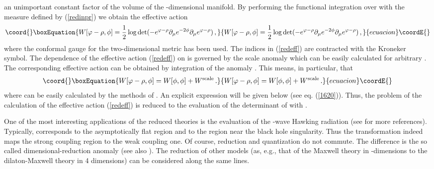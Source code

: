 \documentclass[a4paper,12pt]{article}
\begin{document}
an unimportant constant factor of
the volume of the \coordHE{}-dimensional manifold.
By performing the 
functional integration over \myHighlight{$\psi$}\coordHE{} with the measure defined
by (\ref{redinpr}) we obtain the effective action
\begin{equation}\coord{}\boxEquation{
W[\varphi -\rho ,\phi ]
=\frac 12 \log \det (-e^{\varphi -\rho }
\partial_\mu e^{-2\phi} \partial_\mu e^{\varphi -\rho } )\,,
\label{redeff}
}{
W[\varphi -\rho ,\phi ]
=\frac 12 \log \det (-e^{\varphi -\rho }
\partial_\mu e^{-2\phi} \partial_\mu e^{\varphi -\rho } )\,,
}{ecuacion}\coordE{}\end{equation}
where the conformal gauge for the two-dimensional metric 
\coordHE{} 
has been used. The indices
in (\ref{redeff}) are contracted with the Kroneker symbol.
The dependence of the effective action (\ref{redeff}) on 
\myHighlight{$\varphi -\rho$}\coordHE{} is governed by the scale anomaly which
can be easily calculated for arbitrary \myHighlight{$\varphi -\rho$}\coordHE{}.
The corresponding effective action can be
obtained by integration of the anomaly \cite{Kummer:1997jr,Mukhanov:1994ax}.
This means, in particular, that 
\begin{equation}\coord{}\boxEquation{
W[\varphi -\rho ,\phi ]=W[\phi ,\phi ]+W^{\mbox{\scriptsize scale}}\,.
\label{scaling}
}{
W[\varphi -\rho ,\phi ]=W[\phi ,\phi ]+W^{\mbox{\scriptsize scale}}\,.
}{ecuacion}\coordE{}\end{equation}
where \coordHE{} can be easily calculated
by the methods of 
\cite{Kummer:1997jr,Alvarez:1983zi,Dowker:1990ue,Tseytlin:2000jr}.
An explicit expression will be given below (see eq. (\ref{1620})).
Thus, the problem of the calculation of the
effective action (\ref{redeff}) is  reduced to the evaluation of 
the determinant of \myHighlight{$\Delta_+$}\coordHE{} with \coordHE{}.

One of the most interesting applications of the reduced
theories is the evaluation of the \coordHE{}-wave Hawking radiation
\cite{Mukhanov:1994ax} (see \cite{Kummer:1999zy} for more references).
Typically, \myHighlight{$\phi\to -\infty$}\coordHE{} corresponds to the asymptotically
flat region and \myHighlight{$\phi\to +\infty$}\coordHE{} to the region near the
black hole singularity. Thus the transformation \myHighlight{$\phi \to -\phi$}\coordHE{}
indeed maps the strong coupling region to the weak coupling one.
Of course, reduction and quantization do not commute. The difference
is the so called dimensional-reduction anomaly 
\cite{Frolov:2000an,Sutton:2000gm,Cognola:2000xp} 
(see also \cite{Nojiri:1999br}).
The reduction of other models (as, e.g., that of the Maxwell
theory in \coordHE{}-dimensions to the dilaton-Maxwell theory in
4 dimensions) can be considered along the same lines.
\end{document}
